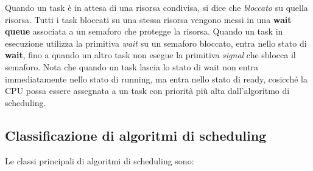 \documentclass[12pt]{article}
\begin{document}
\noindent Quando un task è in attesa di una risorsa condivisa, si dice che \textit{bloccato} su quella risorsa.
Tutti i task bloccati su una stessa risorsa vengono messi in una \textbf{wait queue} associata a un semaforo che protegge la risorsa.
Quando un task in esecuzione utilizza la primitiva \textit{wait} su un semaforo bloccato, entra nello stato di \textbf{wait}, fino a quando un altro task non esegue la primitiva \textit{signal} che sblocca il semaforo.
Nota che quando un task lascia lo stato di wait non entra immediatamente nello stato di running, ma entra nello stato di ready, cosicché la CPU possa essere assegnata a un task con priorità più alta dall'algoritmo di scheduling.

\subsection{Classificazione di algoritmi di scheduling}
Le classi principali di algoritmi di scheduling sono:
\end{document}
